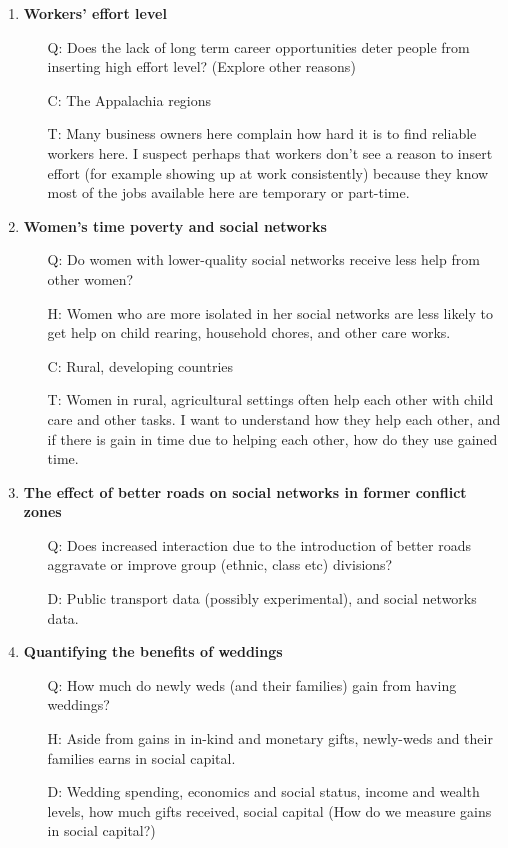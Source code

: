 \documentclass[12pt]{article}
\begin{document}
\begin{enumerate}
	\item \textbf{Workers' effort level}
		\begin{itemize}
			\item[Q:] Does the lack of long term career opportunities deter people from inserting high effort level? (Explore other reasons)
			\item[C:] The Appalachia regions
			\item[T:] Many business owners here complain how hard it is to find reliable workers here. I suspect perhaps that workers don't see a reason to insert effort (for example showing up at work consistently) because they know most of the jobs available here are temporary or part-time.
		\end{itemize}	
	
	\item \textbf{Women's time poverty and social networks}
		\begin{itemize}
			\item[Q:] Do women with lower-quality social networks receive less help from other women?
			\item[H:] Women who are more isolated in her social networks are less likely to get help on child rearing, household chores, and other care works.
			\item[C:] Rural, developing countries
			\item[T:] Women in rural, agricultural settings often help each other with child care and other tasks. I want to understand how they help each other, and if there is gain in time due to helping each other, how do they use gained time.
		\end{itemize}

	\item \textbf{The effect of better roads on social networks in former conflict zones}
		\begin{itemize}
			\item[Q:] Does increased interaction due to the introduction of better roads aggravate or improve group (ethnic, class etc) divisions?
			\item[D:] Public transport data (possibly experimental), and social networks data.
		\end{itemize}	

	\item \textbf{Quantifying the benefits of weddings}
		\begin{itemize}
			\item[Q:] How much do newly weds (and their families) gain from having weddings? 
			\item[H:] Aside from gains in in-kind and monetary gifts, newly-weds and their families earns in social capital. 
			\item[D:] Wedding spending, economics and social status, income and wealth levels, how much gifts received, social capital (How do we measure gains in social capital?) 
		\end{itemize}
	

\end{enumerate}
\end{document}
